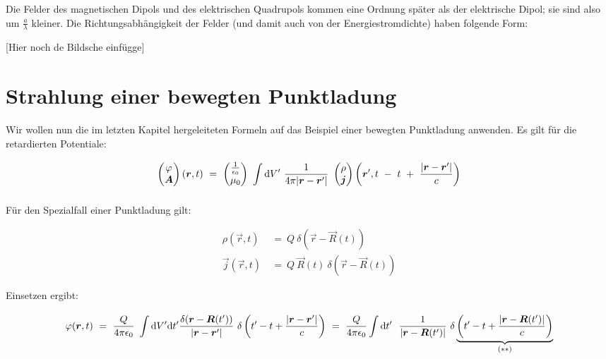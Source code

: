 Die Felder des magnetischen Dipols und des elektrischen Quadrupols kommen eine Ordnung später als der elektrische Dipol; sie sind also um $\frac{a}{\lambda}$ kleiner. Die Richtungsabhängigkeit der Felder (und damit auch von der Energiestromdichte) haben folgende Form:

[Hier noch de Bildsche einfügge]

\section{Strahlung einer bewegten Punktladung}

Wir wollen nun die im letzten Kapitel hergeleiteten Formeln auf das Beispiel einer bewegten Punktladung anwenden. Es gilt für die retardierten Potentiale:

\begin{equation*}
\begin{pmatrix}
\varphi\\
\vec{A}
\end{pmatrix}
\left(\vec{r},t\right) \ = \ \begin{pmatrix}
\frac{1}{\epsilon_0}\\
\mu_0
\end{pmatrix}
\ \Int{}{}{V'}\frac{1}{4\pi|\vec{r}-\vec{r}'|} \ \begin{pmatrix}
\rho\\
\vec{j}
\end{pmatrix}
\left(\vec{r}', t \ - \ t \ + \ \frac{|\vec{r}-\vec{r}'|}{c}\right)
\end{equation*}

Für den Spezialfall einer Punktladung gilt:

\begin{align*}
\rho(\vec{r},t)  \ &= \ Q \ \delta\left(\vec{r}-\vec{R}(t)\right)\\
\vec{j}(\vec{r},t)  \ &= \ Q \ \vec{R}(t) \ \delta\left(\vec{r}-\vec{R}(t)\right) 
\end{align*}

Einsetzen ergibt:

\begin{align*}
\varphi(\vec{r},t)  \ = \ \frac{Q}{4\pi\epsilon_0} \ \int\d V'\d t' \frac{\delta(\vec{r}-\vec{R}(t'))}{|\vec{r}-\vec{r}'|} \ \delta\left(t'-t + \frac{|\vec{r}-\vec{r}'|}{c}\right)  \ = \ \frac{Q}{4\pi\epsilon_0}\Int{}{}{t'} \ \frac{1}{|\vec{r}-\vec{R}(t')|} \ \delta\underbrace{\left(t'-t+\frac{|\vec{r}-\vec{R}(t')|}{c}\right)}_{(**)}
\end{align*}

